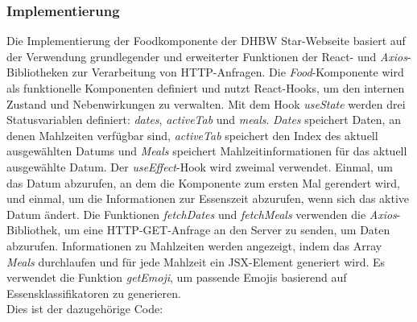 \subsubsection{Implementierung}
Die Implementierung der Foodkomponente der DHBW Star-Webseite basiert auf der Verwendung grundlegender und erweiterter Funktionen der React- und \emph{Axios}-Bibliotheken zur Verarbeitung von HTTP-Anfragen.
Die \emph{Food}-Komponente wird als funktionelle Komponenten definiert und nutzt React-Hooks, um den internen Zustand und Nebenwirkungen zu verwalten. Mit dem Hook \emph{useState} werden drei Statusvariablen definiert: \emph{dates}, \emph{activeTab} und \emph{meals}. \emph{Dates} speichert  Daten, an denen Mahlzeiten verfügbar sind, \emph{activeTab} speichert den Index des aktuell ausgewählten Datums und \emph{Meals} speichert Mahlzeitinformationen für das aktuell ausgewählte Datum. Der \emph{useEffect}-Hook wird zweimal verwendet. Einmal, um das Datum abzurufen, an dem die Komponente zum ersten Mal gerendert wird, und einmal, um die Informationen zur Essenszeit abzurufen, wenn sich das aktive Datum ändert. Die Funktionen \emph{fetchDates} und \emph{fetchMeals} verwenden die \emph{Axios}-Bibliothek, um eine HTTP-GET-Anfrage an den Server zu senden, um Daten abzurufen. 
Informationen zu Mahlzeiten werden angezeigt, indem das Array \emph{Meals} durchlaufen und  für jede Mahlzeit ein JSX-Element generiert wird. Es verwendet die Funktion \emph{getEmoji}, um passende Emojis basierend auf Essensklassifikatoren zu generieren.\\
Dies ist der dazugehörige Code:
\newpage
